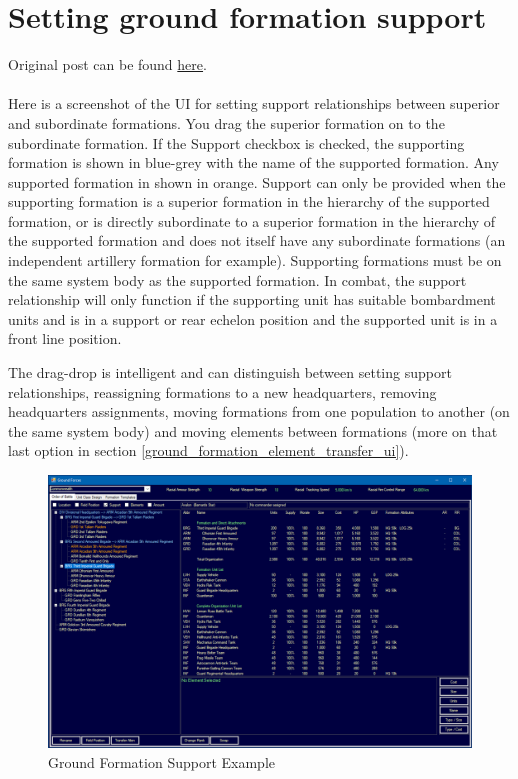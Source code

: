 \documentclass[../../Aurora C# unofficial manual.tex]{subfiles}
\begin{document}
	\section{Setting ground formation support}
	Original post can be found
	\href{http://aurora2.pentarch.org/index.php?topic=8495.msg109807#msg109807}{here}.
	\\\\
	
	Here is a screenshot of the UI for setting support relationships between superior and subordinate formations. You drag the superior formation on to the subordinate formation. If the Support checkbox is checked, the supporting formation is shown in blue-grey with the name of the supported formation. Any supported formation in shown in orange. Support can only be provided when the supporting formation is a superior formation in the hierarchy of the supported formation, or is directly subordinate to a superior formation in the hierarchy of the supported formation and does not itself have any subordinate formations (an independent artillery formation for example). Supporting formations must be on the same system body as the supported formation. In combat, the support relationship will only function if the supporting unit has suitable bombardment units and is in a support or rear echelon position and the supported unit is in a front line position.
	
	The drag-drop is intelligent and can distinguish between setting support relationships, reassigning formations to a new headquarters, removing headquarters assignments, moving formations from one population to another (on the same system body) and moving elements between formations (more on that last option in section \ref{ground_formation_element_transfer_ui}).
	\begin{figure}[H]
		\centering
		\includegraphics[width=0.95\linewidth]{images/GroundFormationSupport}
		\caption[Ground Formation Support]{Ground Formation Support Example}
		\label{fig:groundformationsupport}
	\end{figure}
\end{document}
